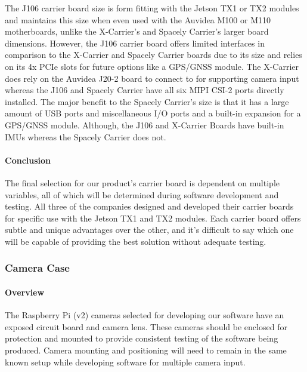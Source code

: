 The J106 carrier board size is form fitting with the Jetson TX1 or TX2 modules and 
maintains this size when even used with the Auvidea M100 or M110 motherboards, unlike 
the X-Carrier's and Spacely Carrier's larger board dimensions. However, the J106 carrier board 
offers limited interfaces in comparison to the X-Carrier and Spacely Carrier boards due 
to its size and relies on its 4x PCIe slots for future options like a GPS/GNSS module. The 
X-Carrier does rely on the Auvidea J20-2 board to connect to for supporting  
camera input whereas the J106 and Spacely Carrier have all six MIPI CSI-2 ports directly 
installed. The major benefit to the Spacely Carrier's size is that it has a large 
amount of USB ports and miscellaneous I/O ports and a built-in expansion for a 
GPS/GNSS module. Although, the J106 and X-Carrier Boards have built-in IMUs whereas the 
Spacely Carrier does not.\\

\paragraph{Conclusion}

The final selection for our product's carrier board is dependent on multiple variables, 
all of which will be determined during software development and testing. All three of 
the companies 
designed and developed their carrier boards for specific use with the Jetson TX1 and 
TX2 modules. Each carrier board offers subtle and unique 
advantages over the other, and it's difficult to say which one will be capable of 
providing the best solution without adequate testing. \\

\subsubsection{Camera Case}

\paragraph{Overview}

The Raspberry Pi (v2) cameras selected for developing our software have an exposed circuit 
board and camera lens. These cameras should be enclosed for protection and mounted to 
provide consistent testing of the software being produced. Camera mounting and positioning
will need to remain in the same known setup while developing software for multiple camera 
input. \\

